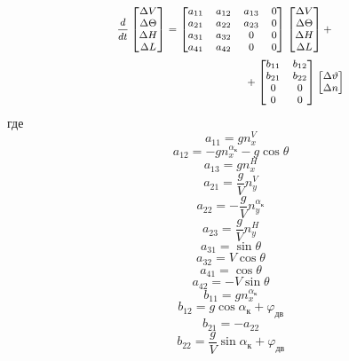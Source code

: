 \documentclass{article}
\begin{document}
\begin{equation}
\medmath{
  \begin{multlined}
  \frac{d}{dt}
  \begin{bmatrix}
  \Delta V\\
  \Delta \Theta\\
  \Delta H\\
  \Delta L
  \end{bmatrix}
  =
  \begin{bmatrix}
  a_{11} & a_{12} & a_{13} & 0 \\
  a_{21} & a_{22} & a_{23} & 0 \\
  a_{31} & a_{32} & 0 & 0 \\
  a_{41} & a_{42} & 0 & 0 \\
  \end{bmatrix}
  \begin{bmatrix}
  \Delta V\\
  \Delta \Theta\\
  \Delta H\\
  \Delta L
  \end{bmatrix}
  + \\ 
  +
  \begin{bmatrix}
  b_{11} & b_{12}\\
  b_{21} & b_{22} \\
  0 & 0 \\
  0 & 0 \\
  \end{bmatrix}
  \begin{bmatrix}
  \Delta \vartheta\\
  \Delta n\\
  \end{bmatrix}
\end{multlined}
}
\end{equation}
где 
\[
a_{11} = g n_x^V 
\]
\[
a_{12} = -g n_x^{\alpha_к} - g \cos{\theta}
\]
\[
a_{13} = g n_x^H
\]
\[
a_{21} = \frac{g}{V} n_y ^V 
\]
\[
a_{22} = -\frac{g}{V} n_y^{\alpha_к}
\]
\[
a_{23} = \frac{g}{V} n_y^H
\]
\[
a_{31} = \sin{\theta}
\]
\[
a_{32} = V \cos{\theta}
\]
\[
a_{41} = \cos{\theta} 
\]
\[
a_{42} = -V \sin{\theta}
\]
\[
b_{11} = gn_x^{\alpha_к}
\]
\[
b_{12} = g \cos{\alpha_к + \varphi_{дв}}
\]
\[
b_{21} = -a_{22}
\]
\[
b_{22} = \frac{g}{V} \sin{\alpha_к + \varphi_{дв}}
\]
\end{document}
